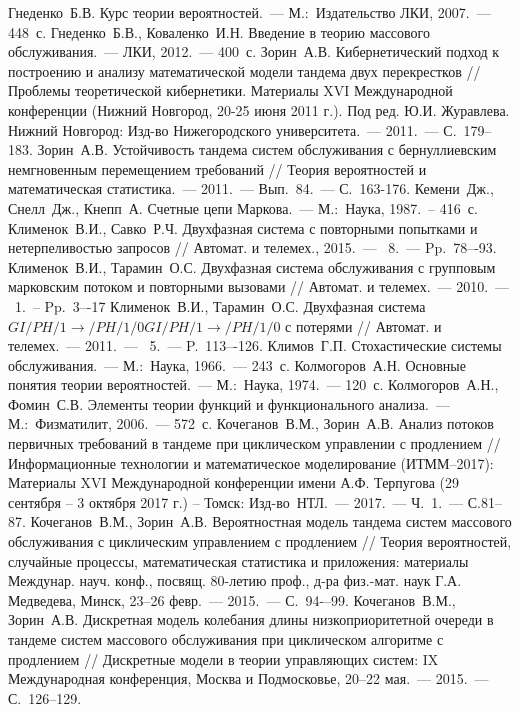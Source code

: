 \documentclass[a4paper,12pt,russian]{extarticle}
\newcommand{\No}{\textnumero}
\begin{document}
\begin{thebibliography}{99}
 Гнеденко~Б.В. Курс теории вероятностей.~--- М.:~Издательство ЛКИ, 2007.~--- 448~с.
 Гнеденко~Б.В., Коваленко~И.Н. Введение в теорию массового обслуживания.~--- ЛКИ, 2012.~--- 400~с.
 Зорин~А.В. Кибернетический подход к построению и анализу математической модели тандема двух перекрестков // Проблемы теоретической кибернетики. Материалы XVI Международной конференции (Нижний Новгород, 20-25 июня 2011 г.). Под ред. Ю.И. Журавлева. Нижний Новгород: Изд-во Нижегородского университета.~--- 2011.~--- С.~179--183.
 Зорин~А.В. Устойчивость тандема систем обслуживания с бернуллиевским немгновенным перемещением требований // Теория вероятностей и математическая статистика.~--- 2011.~--- Вып.~84.~--- С.~163-176.
 Кемени~Дж., Снелл~Дж., Кнепп~А. Счетные цепи Маркова.~--- М.:~Наука, 1987.~-- 416~с.
 Клименок~В.И., Савко~Р.Ч. Двухфазная система с повторными попытками и нетерпеливостью запросов // Автомат. и телемех., 2015.~--- \No{}~8.~--- Pp.~78–-93. 
 Клименок~В.И., Тарамин~О.С. Двухфазная система обслуживания с групповым марковским потоком и повторными вызовами // Автомат. и телемех.~--- 2010.~--- \No~1.~-- Pp.~3–-17 
 Клименок~В.И., Тарамин~О.С. Двухфазная система $GI/PH/1 \to /PH/1/0GI/PH/1 \to /PH/1/0$ с потерями // Автомат. и телемех.~--- 2011.~--- \No{}~5.~--- P.~113–-126.
 Климов~Г.П. Стохастические системы обслуживания.~--- М.:~Наука, 1966.~--- 243~с.
 Колмогоров~А.Н. Основные понятия теории вероятностей.~--- М.:~Наука, 1974.~--- 120~с.
 Колмогоров~А.Н., Фомин~С.В. Элементы теории функций и функционального анализа.~--- М.:~Физматилит, 2006.~--- 572~с.
 Кочеганов~В.М., Зорин~А.В. Анализ потоков первичных требований в тандеме при циклическом управлении с продлением // Информационные технологии и математическое моделирование (ИТММ--2017): Материалы XVI Международной конференции имени А.Ф. Терпугова (29 сентября -- 3 октября 2017 г.) -- Томск: Изд-во~НТЛ.~--- 2017.~--- Ч.~1.~--- С.81--87.
 Кочеганов~В.М., Зорин~А.В. Вероятностная модель тандема систем массового обслуживания с циклическим управлением с продлением // Теория вероятностей, случайные процессы, математическая статистика и приложения: материалы Междунар. науч. конф., посвящ. 80-летию проф., д-ра физ.-мат. наук Г.А. Медведева, Минск, 23–26 февр.~--- 2015.~--- С.~94-–99.
 Кочеганов~В.М., Зорин~А.В. Дискретная модель колебания длины низкоприоритетной очереди в тандеме систем массового обслуживания при циклическом алгоритме с продлением // Дискретные модели в теории управляющих систем: IX Международная конференция, Москва и Подмосковье, 20–22 мая.~--- 2015.~--- С.~126--129.

\end{thebibliography}
\end{document}
